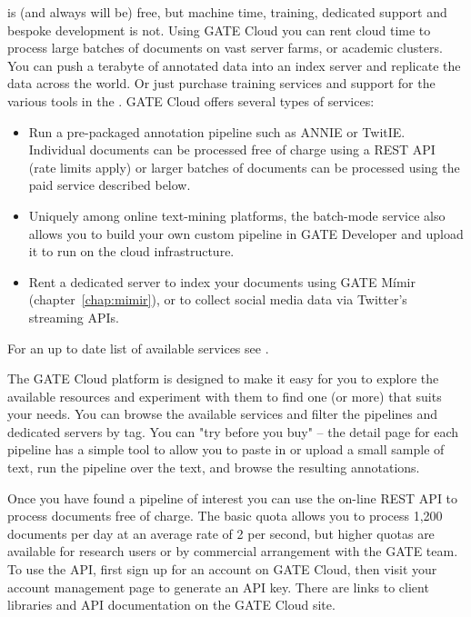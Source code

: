  is (and always will be) free, but machine time,
training, dedicated support and bespoke development is not. Using GATE Cloud
you can rent cloud time to process large batches of documents on vast server
farms, or academic clusters. You can push a terabyte of annotated data into an
index server and replicate the data across the world. Or just purchase
training services and support for the various tools in the
.
%
GATE Cloud offers several types of services:
\begin{itemize}
\item Run a pre-packaged annotation pipeline such as ANNIE or TwitIE.
  Individual documents can be processed free of charge using a REST API (rate
  limits apply) or larger batches of documents can be processed using the paid
  service described below.
\item Uniquely among online text-mining platforms, the batch-mode service also
  allows you to build your own custom pipeline in GATE Developer and upload it
  to run on the cloud infrastructure.
\item Rent a dedicated server to index your documents using GATE M\'{i}mir
  (chapter~\ref{chap:mimir}), or to collect social media data via Twitter's
  streaming APIs.
\end{itemize}

For an up to date list of available services see
.



The GATE Cloud platform is designed to make it easy for you to explore the
available resources and experiment with them to find one (or more) that suits
your needs. You can browse the available services and filter the pipelines and
dedicated servers by tag. You can "try before you buy" -- the detail page for
each pipeline has a simple tool to allow you to paste in or upload a small
sample of text, run the pipeline over the text, and browse the resulting
annotations.

Once you have found a pipeline of interest you can use the on-line REST API to
process documents free of charge.  The basic quota allows you to process 1,200
documents per day at an average rate of 2 per second, but higher quotas are
available for research users or by commercial arrangement with the GATE team.
To use the API, first sign up for an account on GATE Cloud, then visit your
account management page to generate an API key.  There are links to client
libraries and API documentation on the GATE Cloud site.

